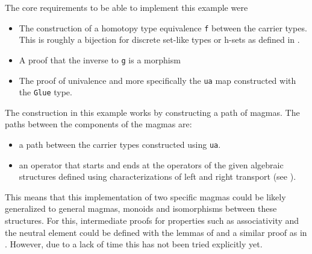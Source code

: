 \documentclass[12pt,a4paper,twoside,xetex]{book} %
\begin{document}
The core requirements to be able to implement this example were
\begin{itemize}
 \item The construction of a homotopy type equivalence \texttt{f} between the carrier types. This is roughly a bijection for discrete set-like types or h-sets as defined in .
 \item A proof that the inverse to \texttt{g} is a morphism
 \item The proof of univalence and more specifically the \texttt{ua} map constructed with the \texttt{Glue} type. 
\end{itemize}

The construction in this example works by constructing a path of magmas. The paths between the components of the magmas are:
\begin{itemize}
\item a path between the carrier types constructed using \texttt{ua}.
\item an operator that starts and ends at the operators of the given algebraic structures defined using characterizations of left and right transport (see ).
\end{itemize}

This means that this implementation of two specific magmas could be likely generalized to general magmas, monoids and isomorphisms between these structures. For this, intermediate proofs for properties such as associativity and the neutral element  could be defined  with the lemmas of  and a similar proof as in . However, due to a lack of time this has not been tried explicitly yet.
\end{document}
